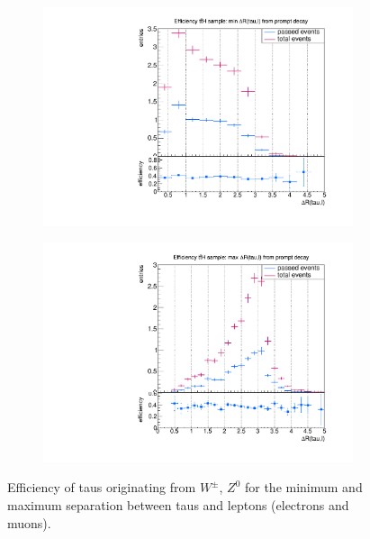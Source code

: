 \begin{figure}
  \centering
                \begin{subfigure}[t]{0.49\textwidth}
                \includegraphics[width=\textwidth]{figures/plots/ttH/Divided_pr_mindR_taulepton.pdf}
                \label{dR:prompt:taulepton:min}
                \end{subfigure}
                \begin{subfigure}[t]{0.49\textwidth}
                \includegraphics[width=\textwidth]{figures/plots/ttH/Divided_maxdR_pr_taulepton.pdf}
                \label{dR:prompt:taulepton:max}
                \end{subfigure}
\caption[Efficiency of taus originating from $W^\pm$, $Z^0$ for the separation between taus and leptons.]{Efficiency of taus originating from $W^\pm$, $Z^0$ for the minimum and maximum separation between taus and leptons (electrons and muons).}
\label{dR:prompt:taulepton}
\end{figure}
